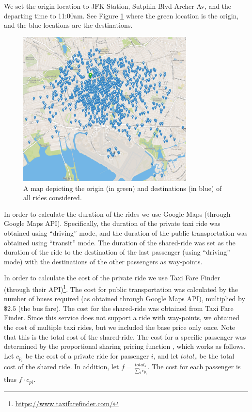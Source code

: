 \documentclass[letterpaper]{article} %
\begin{document}
We set the origin location to JFK Station, Sutphin Blvd-Archer Av, and the departing time to 11:00am. See Figure \ref{fig:destinations} where the green location is the origin, and the blue locations are the destinations.

\begin{figure}[hbpt]
\centering
\includegraphics[width=3.5in]{map2.pdf} 
\caption{A map depicting the origin (in green) and destinations (in blue) of all rides considered.}
\label{fig:destinations}
\end{figure}

In order to calculate the duration of the rides we use Google Maps (through Google Maps API). Specifically, the duration of the private taxi ride was obtained using ``driving'' mode, and the duration of the public transportation was obtained using ``transit'' mode. The duration of the shared-ride was set as the duration of the ride to the destination of the last passenger (using ``driving'' mode) with the destinations of the other passengers as way-points.

In order to calculate the cost of the private ride we use Taxi Fare Finder (through their API)\footnote{\url{https://www.taxifarefinder.com/}}. The cost for public transportation was calculated by the number of buses required (as obtained through Google Maps API), multiplied by $\$2.5$ (the bus fare). The cost for the shared-ride was obtained from Taxi Fare Finder. Since this service does not support a ride with way-points, we obtained the cost of multiple taxi rides, but we included the base price only once. Note that this is the total cost of the shared-ride.
The cost for a specific passenger was determined by the proportional sharing pricing function \cite{fishburn1983fixed}, which works as follows. Let $c_{p_i}$ be the cost of a private ride for passenger $i$, and let $total_s$ be the total cost of the shared ride. In addition, let $f=\frac{total_s}{\sum_i c_{p_i}}$. The cost for each passenger is thus $f \cdot c_{pi}$.
\end{document}
